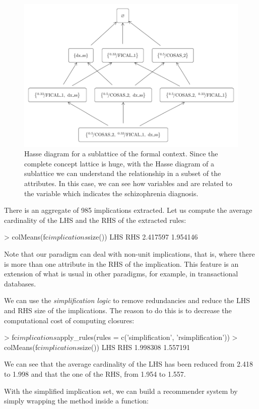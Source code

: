 \begin{figure}[t]
\centering\includegraphics[width=0.6\linewidth]{fig-sublatticecobre32.pdf}
\caption{\label{fig:sublatticecobre32}Hasse diagram for a sublattice of the  formal context. Since the complete concept lattice is huge, with the Hasse diagram of a sublattice we can understand the relationship in a subset of the attributes. In this case, we can see how variables  and  are related to the variable  which indicates the schizophrenia diagnosis.}
\end{figure}

There is an aggregate of 985 implications extracted. Let us compute the
average cardinality of the LHS and the RHS of the extracted rules:

\begin{example}
> colMeans(fc$implications$size())
     LHS      RHS
2.417597 1.954146
\end{example}

Note that our paradigm can deal with non-unit implications, that is,
where there is more than one attribute in the RHS of the implication.
This feature is an extension of what is usual in other paradigms, for
example, in transactional databases.

We can use the \emph{simplification logic} to remove redundancies and
reduce the LHS and RHS size of the implications. The reason to do this
is to decrease the computational cost of computing closures:

\begin{example}
> fc$implications$apply_rules(rules = c('simplification', 'rsimplification'))
> colMeans(fc$implications$size())
     LHS      RHS
1.998308 1.557191
\end{example}

We can see that the average cardinality of the LHS has been reduced from
2.418 to 1.998 and that the one of the RHS, from 1.954 to 1.557.

With the simplified implication set, we can build a recommender system
by simply wrapping the  method inside a function:

